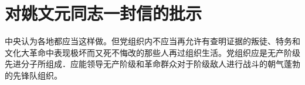 \section[对姚文元同志一封信的批示（一九六七年十二月）]{对姚文元同志一封信的批示}


中央认为各地都应当这样做。但党组织内不应当再允许有查明证据的叛徒、特务和文化大革命中表现极坏而又死不悔改的那些人再过组织生活。党组织应是无产阶级先进分子所组成．应能领导无产阶级和革命群众对于阶级敌人进行战斗的朝气蓬勃的先锋队组织。

